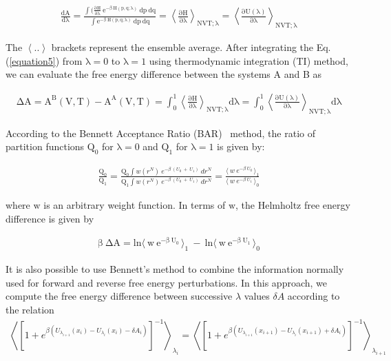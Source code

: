    \begin{eqnarray}
   \mathrm{\frac{dA}{d\lambda}} = \mathrm{\frac{\int(\frac{\partial H}{\partial \lambda}~e^{-\beta~H(p, q; \lambda)}~ dp~dq}{\int e^{-\beta~H(p, q; \lambda)}~dp~dq}} = \mathrm{ \left\langle \frac{\partial H}{\partial\lambda}\right\rangle_{NVT;\lambda}}= \mathrm{\left\langle\frac{\partial U(\lambda)}{\partial\lambda}\right\rangle_{NVT;\lambda}}
   \label{equation5}
   \end{eqnarray}
   
    The $\mathrm{\left\langle ..\right\rangle }$ brackets represent the ensemble average. After integrating the Eq.(\ref{equation5})  from $\mathrm{\lambda=0}$ to  $\mathrm{\lambda=1}$ using thermodynamic integration (TI) method, we can evaluate the free energy difference between the systems A and B as 
       
   \begin{eqnarray}
   \mathrm{\Delta{A}=A^{B}(V, T) - A^{A}(V, T)}=\mathrm{\int_0^1\left\langle\frac{\partial H}{\partial\lambda}\right\rangle_{NVT;\lambda} d\lambda}=\mathrm{\int_0^1\left\langle \frac{\partial U(\lambda)} {\partial\lambda} \right\rangle_{NVT;\lambda}d\lambda }
   \end{eqnarray}
   
    According to the Bennett Acceptance Ratio (BAR)~\citep{bennett1976} method, the ratio of partition functions $\mathrm{Q_{0}} $ for $\mathrm{\lambda}=0$ and $\mathrm{Q_{1}} $ for $\mathrm{\lambda}=1$ is given by:
    
   \begin{eqnarray}
   \frac{\mathrm{Q_{0}}}{\mathrm{Q_{1}}} =\frac{\mathrm{Q_{0}}\int w(r^{N})~e^{-\beta~(U_{0}~+~U_{1})}~dr^{N}}{\mathrm{Q_{1}}\int w(r^{N})~e^{-\beta~(U_{0}~+~U_{1})}~dr^{N}}=\frac{\langle~w~e^{-\beta~U_{0}~}\rangle_{1}}{\langle~w~e^{-\beta~U_{1}~}\rangle_{0}}
   \label{equation11}
   \end{eqnarray}
   
   where $\mathrm{w}$ is an arbitrary weight function. In terms of $\mathrm{w}$, the Helmholtz free energy difference is given by
      
   \begin{eqnarray}
   \mathrm{\beta~\Delta A} =\mathrm{ln\langle~w~e^{-\beta~U_{0}~}\rangle_{1}}~-~\mathrm{
   ln\langle~w~e^{-\beta~U_{1}~}\rangle_{0}}
   \label{equation12}
   \end{eqnarray}
   
   It is also possible to use Bennett's method to combine the information normally used for forward and reverse free energy perturbations. In this approach, we  compute the free energy difference between successive $\lambda$ values $\delta A$ according to the relation
   \begin{eqnarray}
   \left\langle \left[ 1+ e^{\beta \left( U_{\lambda_{i+1}}(x_i)- U_{\lambda_{i}}(x_i) - \delta A_i \right) }\right]^{-1} \right\rangle_{\lambda_i}  =
   \left\langle \left[1+ e^{\beta \left( U_{\lambda_{i+1}}(x_{i+1})- U_{\lambda_{i}}(x_{i+1}) + \delta A_i\right) }\right]^{-1} \right\rangle_{\lambda_{i+1}} 
   \end{eqnarray}
   
